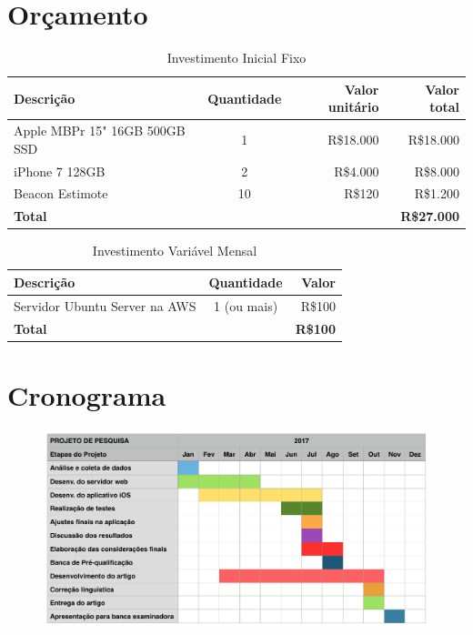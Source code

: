\documentclass[
	12pt,
	oneside,
	a4paper,
	english,
	brazil,
]{abntex2}
\begin{document}

\chapter{Orçamento}

\begin{table}[ht]
\caption{Investimento Inicial Fixo}
\begin{tabular}{lcrr}
\hline\hline
Descrição & Quantidade & Valor unitário & Valor total \\ [0.5ex]
\hline
Apple MBPr 15" 16GB 500GB SSD&1&R\$18.000&R\$18.000 \\
iPhone 7 128GB&2&R\$4.000&R\$8.000 \\
Beacon Estimote&10&R\$120&R\$1.200 \\ [1ex]
\hline
\textbf{Total}&&&\textbf{R\$27.000} \\ [1ex]
\end{tabular}
\label{table:nonlin}
\end{table}

\begin{table}[ht]
\caption{Investimento Variável Mensal}
\begin{tabular}{lcr}
\hline\hline
Descrição & Quantidade &Valor \\ [0.5ex]
\hline
Servidor Ubuntu Server na AWS &1 (ou mais)&R\$100 \\
\hline
\textbf{Total}&&\textbf{R\$100} \\ [1ex]
\end{tabular}
\label{table:nonlin}
\end{table}



\chapter{Cronograma}

\begin{figure}[h]
\centering
\includegraphics[width=1.0\textwidth]{cronograma}
\end{figure}
\end{document}
